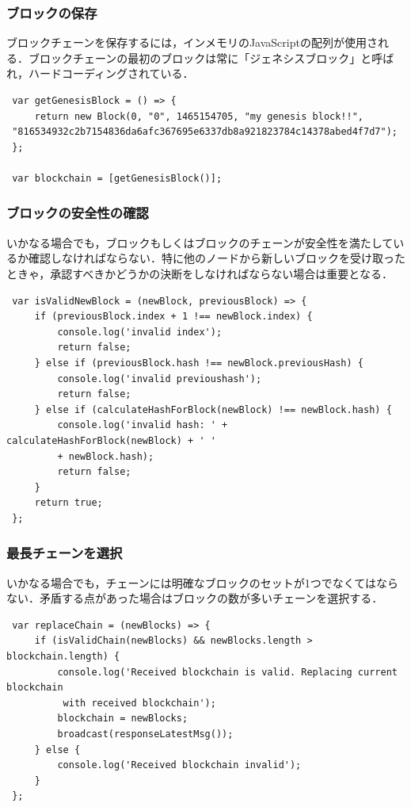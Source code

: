 \subsubsection{ブロックの保存}
ブロックチェーンを保存するには，インメモリのJavaScriptの配列が使用される．ブロックチェーンの最初のブロックは常に「ジェネシスブロック」と呼ばれ，ハードコーディングされている．

\begin{verbatim}
 var getGenesisBlock = () => { 
     return new Block(0, "0", 1465154705, "my genesis block!!",
 "816534932c2b7154836da6afc367695e6337db8a921823784c14378abed4f7d7"); 
 }; 
 
 var blockchain = [getGenesisBlock()]; 
\end{verbatim}

\newpage

\subsubsection{ブロックの安全性の確認}
いかなる場合でも，ブロックもしくはブロックのチェーンが安全性を満たしているか確認しなければならない．特に他のノードから新しいブロックを受け取ったときゃ，承認すべきかどうかの決断をしなければならない場合は重要となる．

\begin{verbatim}
 var isValidNewBlock = (newBlock, previousBlock) => { 
     if (previousBlock.index + 1 !== newBlock.index) { 
         console.log('invalid index'); 
         return false; 
     } else if (previousBlock.hash !== newBlock.previousHash) { 
         console.log('invalid previoushash'); 
         return false; 
     } else if (calculateHashForBlock(newBlock) !== newBlock.hash) { 
         console.log('invalid hash: ' + calculateHashForBlock(newBlock) + ' ' 
         + newBlock.hash); 
         return false; 
     } 
     return true; 
 }; 
\end{verbatim}

\subsubsection{最長チェーンを選択}
いかなる場合でも，チェーンには明確なブロックのセットが1つでなくてはならない．矛盾する点があった場合はブロックの数が多いチェーンを選択する．

\begin{verbatim}
 var replaceChain = (newBlocks) => { 
     if (isValidChain(newBlocks) && newBlocks.length > blockchain.length) { 
         console.log('Received blockchain is valid. Replacing current blockchain
          with received blockchain'); 
         blockchain = newBlocks; 
         broadcast(responseLatestMsg()); 
     } else { 
         console.log('Received blockchain invalid'); 
     } 
 }; 
\end{verbatim}

